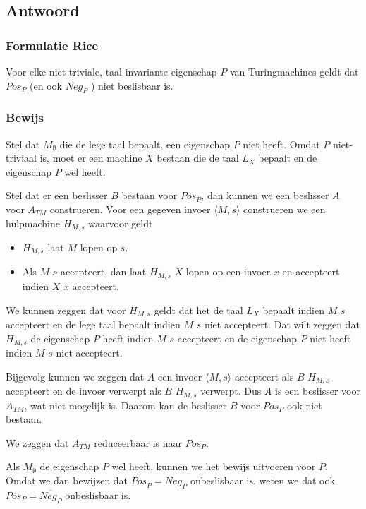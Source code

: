 \documentclass{article}
\begin{document}
    \subsection{Antwoord}
        \subsubsection{Formulatie Rice}
            Voor elke niet-triviale, taal-invariante eigenschap $P$ van Turingmachines geldt dat $Pos_P$ (en ook $Neg_P$ ) niet beslisbaar is.
        \subsubsection{Bewijs}
            Stel dat $M_\emptyset$ die de lege taal bepaalt, een eigenschap $P$ niet heeft. Omdat $P$ niet-triviaal is, moet er een machine $X$ bestaan die de taal $L_X$ bepaalt en de eigenschap $P$ wel heeft.

            Stel dat er een beslisser $B$ bestaan voor $Pos_P$, dan kunnen we een beslisser $A$ voor $A_{TM}$ construeren. Voor een gegeven invoer $\langle M,s \rangle$ construeren we een hulpmachine $H_{M,s}$ waarvoor geldt
            \begin{itemize}
                \item $H_{M,s}$ laat $M$ lopen op $s$.
                \item Als $M$ $s$ accepteert, dan laat $H_{M,s}$ $X$ lopen op een invoer $x$ en accepteert indien $X$ $x$ accepteert.
            \end{itemize}
            
            We kunnen zeggen dat voor $H_{M,s}$ geldt dat het de taal $L_X$ bepaalt indien $M$ $s$ accepteert en de lege taal bepaalt indien $M$ $s$ niet accepteert. Dat wilt zeggen dat $H_{M,s}$ de eigenschap $P$ heeft indien $M$ $s$ accepteert en de eigenschap $P$ niet heeft indien $M$ $s$ niet accepteert.
            
            Bijgevolg kunnen we zeggen dat $A$ een invoer $\langle M,s \rangle$ accepteert als $B$ $H_{M,s}$ accepteert en de invoer verwerpt als $B$ $H_{M,s}$ verwerpt. Dus $A$ is een beslisser voor $A_{TM}$, wat niet mogelijk is. Daarom kan de beslisser $B$ voor $Pos_P$ ook niet bestaan.
            
            We zeggen dat $A_{TM}$ reduceerbaar is naar $Pos_P$.
            
            Als $M_\emptyset$ de eigenschap $P$ wel heeft, kunnen we het bewijs uitvoeren voor $\overline{P}$. Omdat we dan bewijzen dat $Pos_{\overline{P}} = Neg_P$ onbeslisbaar is, weten we dat ook $Pos_P = \overline{Neg_P}$ onbeslisbaar is.
\end{document}
